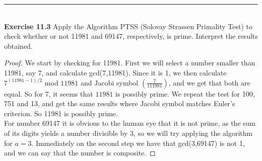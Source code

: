 \documentclass[a4paper]{article}
\begin{document}
\noindent\rule{12cm}{0.4pt}\\
\noindent \textbf{Exercise 11.3} Apply the Algorithm PTSS (Solovay Strassen Primality Test) to check whether or not 11981 and 69147, respectively, is prime. Interpret the results obtained.
\begin{proof}
We start by checking for 11981. First we will select a number smaller than 11981, say 7, and calculate gcd(7,11981). Since it is 1, we then calculate $7^{(11981-1)/2}$ mod $11981$ and Jacobi symbol $\left(\frac{7}{111981}\right)$, and we get that both are equal. So for 7, it seems that $11981$ is possibly prime. We repeat the test for 100, 751 and 13, and get the same results where Jacobi symbol matches Euler's criterion. So 11981 is possibly prime.\\
For number 69147 it is obvious to the human eye that it is not prime, as the sum of its digits yields a number divisible by 3, so we will try applying the algorithm for $a=3$. Immediately on the second step we have that gcd(3,69147) is not 1, and we can say that the number is composite.
\end{proof}
\end{document}
